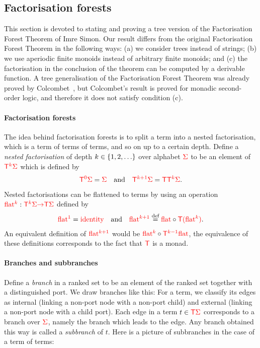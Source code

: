 \subsection{Factorisation forests}
\label{sec:factfor}
This section is devoted to stating and proving a tree version of the Factorisation Forest Theorem of Imre Simon.  Our result differs from the original Factorisation Forest Theorem in the following ways: (a) we consider trees instead of strings; (b) we use aperiodic finite monoids instead of arbitrary finite monoids; and (c) the factorisation in the conclusion of the theorem can be computed by a derivable function.  A tree generalisation of the Factorisation Forest Theorem was already proved by Colcombet~\cite[Theorem 1 and Section 3.3]{colcombetCombinatorialTheoremTrees2007}, but Colcombet's result is proved for monadic second-order logic, and therefore it does not satisfy condition (c). 



\paragraph{Factorisation forests} The idea behind factorisation forests is to split a term into a nested factorisation, which is a term of terms of terms, and so on up to a certain depth.  
Define a \emph{nested factorisation} of depth $k \in \{1,2,\ldots\}$ over alphabet ${\color{red}{\Sigma}}$ to be an element of ${\color{red}{\mathsf T}}^{{\color{red}{k}}} {\color{red}{\Sigma}}$ which is defined by
\begin{align*}
{\color{red}{\mathsf T}}^{{\color{red}{0}}} {\color{red}{\Sigma}} = {\color{red}{\Sigma}}  \quad \text{and} \quad {\color{red}{\mathsf T}}^{{\color{red}{k+1}}}{\color{red}{\Sigma}} = {\color{red}{\mathsf T}} {\color{red}{\mathsf T}}^{{\color{red}{k}}} {\color{red}{\Sigma}}.
\end{align*}
Nested factorisations can be flattened to terms by using an  operation ${\color{red}{\mathrm{flat}}}^{{\color{red}{k}}} : {\color{red}{\mathsf T}}^{{\color{red}{k}}} {\color{red}{\Sigma}} {\color{red}{\to}} {\color{red}{\mathsf T}} {\color{red}{\Sigma}} $ defined by 
\begin{align*}
     {\color{red}{\mathrm{flat}}}^{{\color{red}{1}}} = \text{{\color{red}{identity}}} \quad \text{and} \quad  {\color{red}{\mathrm{flat}}}^{{\color{red}{k+1}}} \stackrel{\text{def}}= {\color{red}{\mathrm{flat}}}  \circ {\color{red}{\mathsf T}} {\color{red}{(}} {\color{red}{\mathrm{flat}}}^{{\color{red}{k}}}{\color{red}{)}}.
\end{align*}
An equivalent definition of ${\color{red}{\mathrm{flat}}}^{{\color{red}{k+1}}}$ would be ${\color{red}{\mathrm{flat}}}^{{\color{red}{k}}} \circ {\color{red}{\mathsf T}}^{{\color{red}{k-1}}} {\color{red}{\mathrm{flat}}}$, the equivalence of these definitions corresponds to the fact that ${\color{red}{\mathsf T}}$ is a monad.


\paragraph{Branches and subbranches}
Define a \emph{branch} in a ranked set to be an element  of the ranked set together with a distinguished port. 
We draw branches like  this:
For a term, we classify its edges as internal (linking a non-port node with a non-port child) and external (linking a non-port node with a child port). Each edge in a term $t \in {\color{red}{\mathsf T}} {\color{red}{\Sigma}}$ corresponds to a branch over ${\color{red}{\Sigma}}$, namely the branch which leads to the edge. Any branch obtained this way is called a \emph{subbranch} of $t$. Here is a picture of subbranches in the case of a term of terms:

